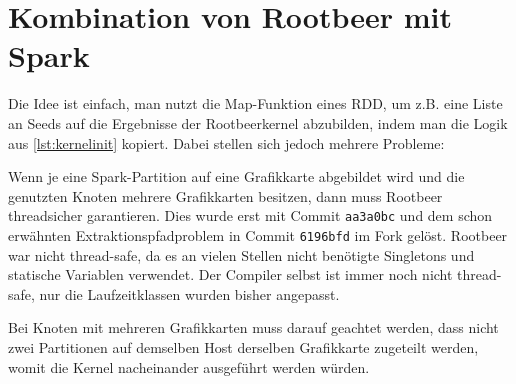 \section{Kombination von Rootbeer mit Spark}

Die Idee ist einfach, man nutzt die Map-Funktion eines RDD, um z.B. eine Liste an Seeds auf die Ergebnisse der Rootbeerkernel abzubilden, indem man die Logik aus \autoref{lst:kernelinit} kopiert.
Dabei stellen sich jedoch mehrere Probleme:

Wenn je eine Spark-Partition auf eine Grafikkarte abgebildet wird und die genutzten Knoten mehrere Grafikkarten besitzen, dann muss Rootbeer threadsicher garantieren.
Dies wurde erst mit Commit \lstinline!aa3a0bc! und dem schon erwähnten Extraktionspfadproblem in Commit \lstinline!6196bfd! im Fork \cite{ownrootbeerfork} gelöst.
Rootbeer war nicht thread-safe, da es an vielen Stellen nicht benötigte Singletons und statische Variablen verwendet. Der Compiler selbst ist immer noch nicht thread-safe, nur die Laufzeitklassen wurden bisher angepasst.

Bei Knoten mit mehreren Grafikkarten muss darauf geachtet werden, dass nicht zwei Partitionen auf demselben Host derselben Grafikkarte zugeteilt werden, womit die Kernel nacheinander ausgeführt werden würden.

